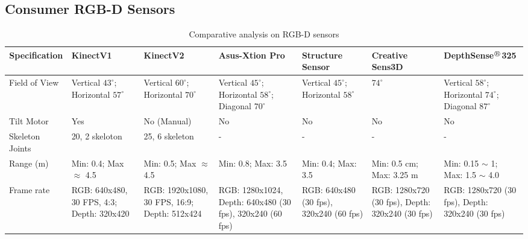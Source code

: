 \clearpage
\begin{landscape}
\small
\section{Consumer RGB-D Sensors} %
\label{appendix:rgbd_sensors}
\centering
\begin{table}[H]
\scriptsize
\caption{Comparative analysis on RGB-D sensors}
\label{table:rgbd_sensors}
\begin{tabularx}{600pt}{c*6{X}}
\toprule
  \textbf{Specification} & \textbf{KinectV1\footnotemark[1]} 
                         & \textbf{KinectV2\footnotemark[1]} 
                         & \textbf{Asus-Xtion Pro\footnotemark[2]} 
                         & \textbf{Structure Sensor\footnotemark[3]}
                         & \textbf{Creative Sens3D\footnotemark[4]} 
                         &  \textbf{DepthSense$^{\regmark}$325\footnotemark[5]} 
  \tabularnewline \midrule
  \multicolumn{1}{l}{Field of View}       & Vertical $43^{\circ}$; Horizontal $57^{\circ}$  
                                          & Vertical $60^{\circ}$; Horizontal $70^{\circ}$ 
                                          & Vertical $45^{\circ}$; Horizontal $58^{\circ}$; Diagonal $70^{\circ}$
                                          & Vertical $45^{\circ}$; Horizontal $58^{\circ}$ 
                                          & $74^{\circ}$
                                          & Vertical $58^{\circ}$; Horizontal $74^{\circ}$; Diagonal $87^{\circ}$
                                          \tabularnewline\midrule
                                          
  \multicolumn{1}{l}{Tilt Motor}          & Yes
  										 & No (Manual)
  										 & No 
  										 & No 
  										 & No
  										 & No 
  										 \tabularnewline\midrule
  \multicolumn{1}{l}{Skeleton Joints}     & 20, 2 skeloton
  										 & 25, 6 skeleton
  										 & - 
  										 & - 
  										 & - 
  										 & - 
  										 \tabularnewline\midrule			
  		 
  \multicolumn{1}{l}{Range (m)}           & Min: 0.4; Max $\approx$ 4.5 
  										 & Min: 0.5; Max $\approx$ 4.5
  										 & Min: 0.8; Max: 3.5
  										 & Min: 0.4; Max: 3.5  
  										 & Min: 0.5 cm; Max: 3.25 m 
  										 & Min: 0.15 $\sim$ 1; Max: 1.5 $\sim$ 4.0 
  										 \tabularnewline\midrule
  										 										 

  \multicolumn{1}{l}{Frame rate }         & RGB: 640x480, 30 FPS, 4:3; Depth: 320x420
  										 & RGB: 1920x1080, 30 FPS, 16:9; Depth: 512x424
  										 & RGB: 1280x1024, Depth: 640x480 (30 fps), 320x240 (60 fps)
  										 & RGB: 640x480 (30 fps), 320x240 (60 fps)
  										 & RGB: 1280x720 (30 fps), Depth: 320x240 (30 fps)
  										 & RGB: 1280x720 (30 fps), Depth: 320x240 (30 fps)
  										 \tabularnewline\midrule
  										 

\end{tabularx}
\end{table}
\end{landscape}
